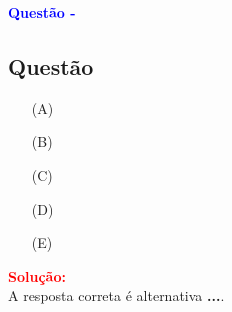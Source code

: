 \begin{flushleft}
\textbf{\textcolor{blue}{\Large Quest\~ao - }}\\
\noindent

\subsection{Quest\~ao }

\begin{itemize}
\item[(A)] 
\item[(B)] 
\item[(C)]
\item[(D)] 
\item[(E)] 
\end{itemize}

\vspace{0.5cm}

\textcolor{red}{\textbf{Solução:}}\\


A resposta correta é alternativa \colorbox{green!50}{\textbf{...}}.

\end{flushleft}